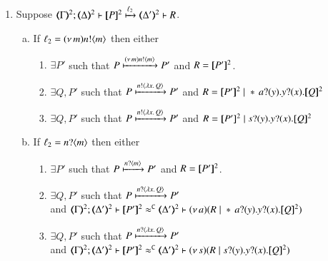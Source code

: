 \begin{proposition}
\begin{enumerate}[1.]
		\item Suppose 
		$\stytra{\mapt{\Gamma}^{2}}{\ell_2}{\mapt{\Delta}^{2}}{\map{P}^{2}}{\mapt{\Delta'}^{2}}{R}$.
			\begin{enumerate}[a)]
				\item %
					If  
					$\ell_2 = (\nu\, m)n ! \langle m \rangle$
					then 
					either 
					\begin{enumerate}[-]
					\item	$\exists P'$ such that $P \xmapsto{(\nu\, m) n !\langle m \rangle} P'$
						and $R = [\!\![P']\!\!]^2$.

					\item	$\exists Q, P'$ such that $P \xmapsto{n !\langle \lambda x.\,Q \rangle} P'$
						and $R = \map{P'}^{2} \Par \repl{} \binp{a}{y} \binp{y}{x} \pmap{Q}{2}$

					\item	$\exists Q, P'$ such that $P \xmapsto{n !\langle \lambda x.\,Q \rangle} P'$
						and $R = \map{P'}^{2} \Par \binp{s}{y} \binp{y}{x} \pmap{Q}{2}$
					\end{enumerate}

				\item   %
					If  $\ell_2 = n ? \langle m \rangle$ 
					then either
					\begin{enumerate}[-]
					\item	$\exists P'$ such that $P \xmapsto{n ?\langle m \rangle} P'$
						and $R = [\!\![P']\!\!]^2$.

					\item	$\exists Q, P'$ such that
						$P \xmapsto{n ?\langle \lambda x.\,Q \rangle} P'$\\
						and $\horel{\mapt{\Gamma}^{2}}{\mapt{\Delta'}^{2}}{\map{P'}^{2}}{\fwb}{\mapt{\Delta'}^{2}}{\news{a}(R \Par \repl{} \binp{a}{y} \binp{y}{x} \pmap{Q}{2})}$
					\item	$\exists Q, P'$ such that
						$P \xmapsto{n ?\langle \lambda x.\,Q \rangle} P'$\\
						and $\horel{\mapt{\Gamma}^{2}}{\mapt{\Delta'}^{2}}{\map{P'}^{2}}{\fwb}{\mapt{\Delta'}^{2}}{\news{s}(R \Par \binp{s}{y} \binp{y}{x} \pmap{Q}{2})}$  
					\end{enumerate}
		

\end{enumerate}
\end{enumerate}
\end{proposition}
